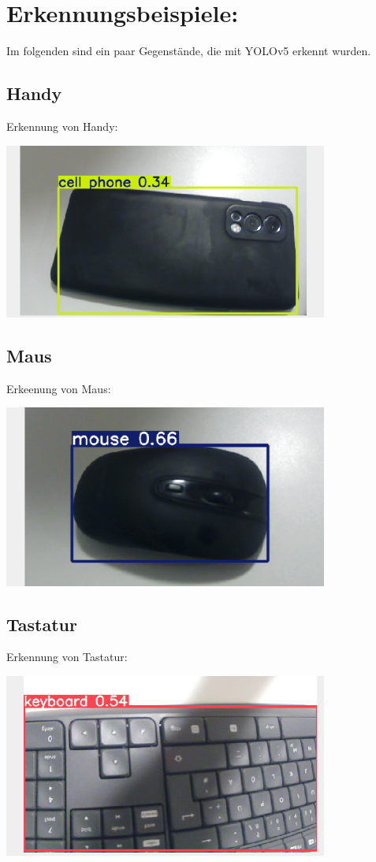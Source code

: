 \documentclass{article}
\begin{document}
\clearpage
\section{Erkennungsbeispiele:}
Im folgenden sind ein paar Gegenstände, die mit YOLOv5 erkennt wurden.
\subsection{Handy}
Erkennung von Handy: 

\begin{center}
    \includegraphics[width=0.8\textwidth]{Bilder/handyErkennung.png}
\end{center}

\subsection{Maus}
Erkeenung von Maus:

\begin{center}
    \includegraphics[width=0.8\textwidth]{Bilder/mausErkennung.png}
\end{center}

\subsection{Tastatur}
Erkennung von Tastatur: 

\begin{center}
    \includegraphics[width=0.8\textwidth]{Bilder/tastaturErkennung.png}
\end{center}
\end{document}
